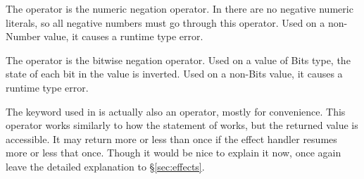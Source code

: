 The operator \op{-} is the numeric negation operator. In \Trilogy{} there are no
negative numeric literals, so all negative numbers must go through this operator.
Used on a non-Number value, it causes a runtime type error.

\begin{prooftree}
\end{prooftree}

The operator \op{\textasciitilde} is the bitwise negation operator. Used on a value
of Bits type, the state of each bit in the value is inverted.
Used on a non-Bits value, it causes a runtime type error.

\begin{prooftree}
\end{prooftree}

The  keyword used in \Poetry{} is actually also an operator, mostly for
convenience. This operator works similarly to how the  statement of \Prose{}
works, but the returned value is accessible. It may return more or less than once if
the effect handler resumes more or less that once. Though it would be nice to explain
it now, once again leave the detailed explanation to \S\ref{sec:effects}.

\FloatBarrier

